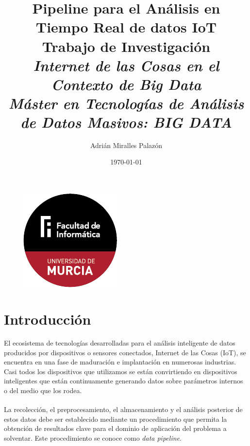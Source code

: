 \documentclass[12pt, a4paper]{article}
\begin{document}
        \title{%
            \textbf{Pipeline para el Análisis en Tiempo Real de datos IoT} \\
            \large Trabajo de Investigación \\
            \textit{Internet de las Cosas en el Contexto de Big Data}\\
            \textit{Máster en Tecnologías de Análisis \\ de Datos Masivos: BIG DATA}
            }
        \author{Adrián Miralles Palazón}
        \date{\today}
        \maketitle

        \begin{figure}[h]
            \centerline{\includegraphics[]{logo}}
        \end{figure}

        \clearpage
        \tableofcontents
        
        \clearpage
        \section{Introducción}

        \paragraph{}
        El ecosistema de tecnologías desarrolladas para el análisis inteligente de datos producidos por dispositivos o sensores conectados, Internet de las Cosas (IoT), se encuentra en una fase de maduración e implantación en numerosas industrias. Casi todos los dispositivos que utilizamos se están convirtiendo en dispositivos inteligentes que están continuamente generando datos sobre parámetros internos o del medio que los rodea.

        \paragraph{}
        La recolección, el preprocesamiento, el almacenamiento y el análisis posterior de estos datos debe ser establecido mediante un procedimiento que permita la obtención de resultados clave para el dominio de aplicación del problema a solventar. Este procedimiento se conoce como \textit{data pipeline}.
\end{document}
